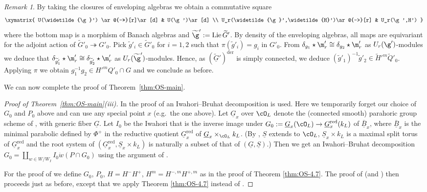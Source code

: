 \documentclass[a4paper]{amsart}
\numberwithin{equation}{section}
\theoremstyle{remark}
\newtheorem{remark}[thm]{Remark}
\theoremstyle{definition}
\DeclareMathOperator{\Lie}{Lie}
\newcommand{\alggrp}[1]{\underline{#1}}
\newcommand{\der}{\mathrm{der}}
\newcommand{\red}{\mathrm{red}}
\newcommand{\onto}{\twoheadrightarrow}
\renewcommand{\o}[1]{\overline{#1}}
\newcommand{\wt}[1]{\widetilde{#1}}
\begin{document}
\begin{remark}
  By taking the closures of enveloping algebras we obtain a commutative square
  \begin{equation*}
    \xymatrix{
    U(\wt\g') \ar@{->>}[r]\ar[d] & U(\g')\ar[d] \\
    U_r(\wt\g',\wt H')\ar@{-->}[r] & U_r(\g',H')
    }
  \end{equation*}
  where the bottom map is a morphism of Banach algebras and $\wt\g' := \Lie \wt G'$.
  By density of the enveloping algebras, all maps are equivariant for the adjoint action of $\wt G'_0 \onto G'_0$.
  Pick $\wt g'_i \in \wt G'_0$ for $i = 1,2$ such that $\pi(\wt g'_i) = g_i$ in $G'_0$.
  From $\delta_{g_1} \star \m_r' \cong \delta_{g_2} \star \m_r'$ as $U_r(\g')$-modules we deduce that $\delta_{\wt g'_1} \star \m_r' \cong \delta_{\wt g'_2} \star \m_r'$ as $U_r(\wt\g')$-modules.
  Hence, as $(\wt {\alggrp G}')^\der$ is simply connected, we deduce $(\wt g'_1)^{-1}\wt g'_2 \in \wt H'^m \wt Q'_0$.
  Applying $\pi$ we obtain $g_1^{-1} g_2 \in H'^m Q'_0 \cap G$ and we conclude as before.
\end{remark}

We can now complete the proof of Theorem~\ref{thm:OS-main}.

\begin{proof}[Proof of Theorem~\ref{thm:OS-main}(iii)]
  In the proof of \cite[Proposition 3.7]{OS3} an Iwahori--Bruhat decomposition is used.  Here we temporarily forget our choice of $G_0$ and $P_0$ above
  and can use any special point $x$ (e.g.\ the one above). Let $\alggrp G_x$ over $\cO_L$ denote the (connected smooth) parahoric group scheme of \cite{BT2}, with generic
  fiber $\alggrp G$.  Let $I_0$ be the Iwahori that is the inverse image under $G_0 := \alggrp G_x(\cO_L) \to \alggrp G_x^{\red}(k_L)$ of $\alggrp{\o B}_x$, where
  $\alggrp{\o B}_x$ is the minimal parabolic defined by $\Phi^+$ in the reductive quotient $\alggrp G_x^{\red}$ of $\alggrp G_x \times_{\cO_L} k_L$. 
  (By \cite{BT2}, $\alggrp S$ extends to $\cO_L$, $\alggrp S_x \times k_L$ is a maximal split torus of $\alggrp G_x^{\red}$ and the
  root system of $(\alggrp G_x^{\red}, \alggrp S_x \times k_L)$ is naturally a subset of that of $(\alggrp G, \alggrp S)$.)  Then we get
  an Iwahori--Bruhat decomposition $G_0 = \coprod_{w \in W/W_I} I_0 \dot w (P \cap G_0)$ using the argument of \cite[\S IV.5]{AHHV}.

  For the proof of \cite[Theorem 4.5]{OS3} we define $G_0$, $P_0$, $H = H^- H^+$, $H^m = H^{-,m} H^{+,m}$ as in the proof of Theorem \ref{thm:OS-4.7}.
  The proof of \cite[Theorem 4.5]{OS3} (and \cite[Theorem 5.8]{OS2}) then proceeds just as before, except that we apply Theorem \ref{thm:OS-4.7} instead of \cite[Theorem 4.7]{OS3}.
\end{proof}
\end{document}
